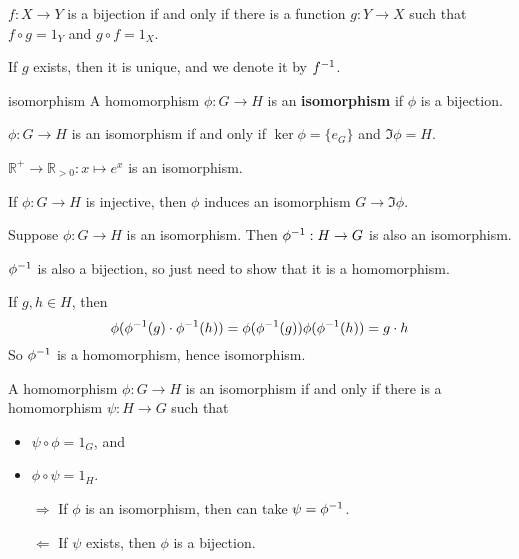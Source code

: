 \begin{prop}
$f:X\to Y$ is a bijection if and only if  there is a function $g:Y\to X$ such that $f\circ g=1_Y$ and $g\circ f = 1_X$.
\end{prop}

If $g$ exists, then it is unique, and we denote it by $f^{-1}$.

\begin{defn}{isomorphism}
A homomorphism $\phi:G\to H$ is an \textbf{isomorphism} if $\phi$ is a bijection.
\end{defn}

\begin{lemma}
$\phi: G\to H$ is an isomorphism if and only if $\ker\phi = \{e_G\}$ and $\Im\phi = H$.
\end{lemma}

\begin{ex}
$\mathbb R^+\to \mathbb R_{>0}:x\mapsto e^x$ is an isomorphism.

If $\phi:G\to H$ is injective, then $\phi$ induces an isomorphism $G\to \Im\phi$.
\end{ex}

\begin{prop}
Suppose $\phi:G\to H$ is an isomorphism. Then $\phi^{-1}:H\to G$ is also an isomorphism.
\end{prop}

\begin{pf}
$\phi^{-1}$ is also a bijection, so just need to show that it is a homomorphism.

If $g,h\in H$, then 
$$
\phi(\phi^{-1}(g)\cdot \phi^{-1} (h)) = \phi(\phi^{-1}(g))\phi(\phi^{-1}(h)) = g\cdot h
$$
So $\phi^{-1}$ is a homomorphism, hence isomorphism.
\end{pf}

\begin{corr}
A homomorphism $\phi:G\to H$ is an isomorphism if and only if there is a homomorphism $\psi:H\to G$ such that
\begin{itemize}
	\item $\psi\circ \phi = 1_G$, and 
	\item $\phi\circ \psi=1_H$.
\end{itemize}
\end{corr}

\begin{pf}
\begin{itemize}
	\item[$\Rightarrow$] If $\phi$ is an isomorphism, then can take $\psi=\phi^{-1}$.
	
	\item[$\Leftarrow$] If $\psi$ exists, then $\phi$ is a bijection.
	
\end{itemize}
\end{pf}

